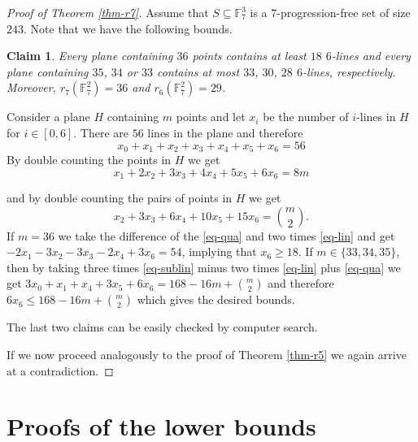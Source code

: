 \documentclass[12pt]{amsart}
\newcommand{\<}{\langle}
\renewcommand{\>}{\rangle}
\newtheorem{claim}{Claim}[theorem]
\renewcommand{\theclaim}{\arabic{claim}}
\newenvironment{proofofclaim}[1][\proofname\ of Claim \theclaim]{%
  \proof[#1]%
  \renewcommand\qedsymbol{$\blacksquare$}
}{\endproof}
\numberwithin{equation}{section}
\numberwithin{theorem}{section}
\begin{document}
\begin{proof}[Proof of Theorem \ref{thm-r7}]
Assume that $S\subseteq \mathbb{F}_7^3$ is a $7$-progression-free set of size $243$. Note that we have the following bounds.

\begin{claim}
Every plane containing $36$ points contains at least $18$ $6$-lines and every plane containing $35$, $34$ or $33$ contains at most $33$, $30$, $28$ $6$-lines, respectively.
Moreover, $r_7(\mathbb{F}_7^2)=36$ and $r_6(\mathbb{F}_7^2)=29$.
\end{claim}
\begin{proofofclaim}
Consider a plane $H$ containing $m$ points and let $x_i$ be the number of $i$-lines in $H$ for $i\in [0,6]$. There are $56$ lines in the plane and therefore 
\begin{equation}\label{eq-sublin}
x_0+x_1+x_2+x_3+x_4+x_5+x_6=56
\end{equation}
By double counting the points in $H$ we get 
\begin{equation}\label{eq-lin}
x_1+2x_2+3x_3+4x_4+5x_5+6x_6=8m
\end{equation}

and by double counting the pairs of points in $H$ we get 
\begin{equation}\label{eq-qua}
x_2+3x_3+6x_4+10x_5+15x_6=\binom{m}{2}.
\end{equation}
If $m=36$ 
we take the difference of the \eqref{eq-qua} and two times \eqref{eq-lin} and get $-2x_1-3x_2-3x_3-2x_4+3x_6=54$, implying that $x_6\geq 18$.
If $m\in\{33,34,35\}$, then by taking three times \eqref{eq-sublin} minus two times \eqref{eq-lin} plus \eqref{eq-qua} we get $3x_0+x_1+x_4+3x_5+6x_6=168-16m+\binom{m}{2}$ and therefore $6x_6\leq168-16m+\binom{m}{2}$ which gives the desired bounds.

The last two claims can be easily checked by computer search.
\end{proofofclaim}


If we now proceed analogously to the proof of Theorem \ref{thm-r5} we again arrive at a contradiction.
\end{proof}


\section{Proofs of the lower bounds}
\end{document}
